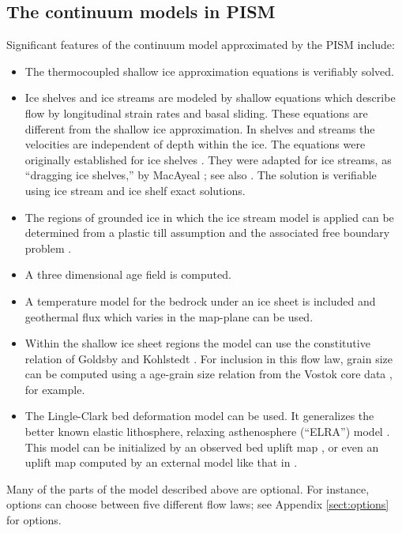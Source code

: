 \documentclass[11pt,final]{amsart}
\begin{document}
\subsection{The continuum models in PISM}  Significant features of the continuum model approximated by the PISM include:\begin{itemize}
\item The thermocoupled shallow ice approximation equations \cite{Fowler} is verifiably \cite{BLKCB,BBL} solved.
\item Ice shelves and ice streams are modeled by shallow equations which describe flow by longitudinal strain rates and basal sliding.  These equations are different from the shallow ice approximation.  In shelves and streams the velocities are independent of depth within the ice.  The equations were originally established for ice shelves \cite{Morland,MorlandZainuddin,MacAyealetal,WeisGreveHutter}.  They were adapted for ice streams, as ``dragging ice shelves,'' by MacAyeal \cite{MacAyeal}; see also \cite{HulbeMacAyeal,SchoofStream}.  The solution is verifiable using ice stream and ice shelf exact solutions.
\item The regions of grounded ice in which the ice stream model is applied can be determined from a plastic till assumption and the associated free boundary problem \cite{SchoofStream}.
\item A three dimensional age field is computed.
\item A temperature model for the bedrock under an ice sheet is included and geothermal flux which varies in the map-plane can be used.
\item Within the shallow ice sheet regions the model can use the constitutive relation of Goldsby and Kohlstedt \cite{GoldsbyKohlstedt,Peltieretal}.  For inclusion in this flow law, grain size can be computed using a age-grain size relation from the Vostok core data \cite{VostokCore}, for example.
\item The Lingle-Clark \cite{BLKfastearth,LingleClark} bed deformation model can be used.  It generalizes the better known elastic lithosphere, relaxing asthenosphere (``ELRA'') model \cite{Greve2001}.  This model can be initialized by an observed bed uplift map \cite{BLKfastearth}, or even an uplift map computed by an external model like that in \cite{IvinsJames2005}.\end{itemize}

Many of the parts of the model described above are optional.  For instance, options can choose between five different flow laws; see Appendix \ref{sect:options} for options.
\end{document}
